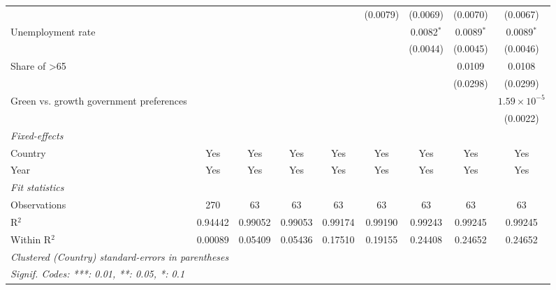 \begin{table}[htbp]
\begin{tabular}{lcccccccc}
                                                                            &          &          &          &              & (0.0079)     & (0.0069)     & (0.0070)     & (0.0067)\\   
      Unemployment rate                                                     &          &          &          &              &              & 0.0082$^{*}$ & 0.0089$^{*}$ & 0.0089$^{*}$\\   
                                                                            &          &          &          &              &              & (0.0044)     & (0.0045)     & (0.0046)\\   
      Share of >65                                                          &          &          &          &              &              &              & 0.0109       & 0.0108\\   
                                                                            &          &          &          &              &              &              & (0.0298)     & (0.0299)\\   
      Green vs. growth government preferences                               &          &          &          &              &              &              &              & $1.59\times 10^{-5}$\\    
                                                                            &          &          &          &              &              &              &              & (0.0022)\\   
      \midrule
      \emph{Fixed-effects}\\
      Country                                                               & Yes      & Yes      & Yes      & Yes          & Yes          & Yes          & Yes          & Yes\\  
      Year                                                                  & Yes      & Yes      & Yes      & Yes          & Yes          & Yes          & Yes          & Yes\\  
      \midrule
      \emph{Fit statistics}\\
      Observations                                                          & 270      & 63       & 63       & 63           & 63           & 63           & 63           & 63\\  
      R$^2$                                                                 & 0.94442  & 0.99052  & 0.99053  & 0.99174      & 0.99190      & 0.99243      & 0.99245      & 0.99245\\  
      Within R$^2$                                                          & 0.00089  & 0.05409  & 0.05436  & 0.17510      & 0.19155      & 0.24408      & 0.24652      & 0.24652\\  
      \midrule \midrule
      \multicolumn{9}{l}{\emph{Clustered (Country) standard-errors in parentheses}}\\
      \multicolumn{9}{l}{\emph{Signif. Codes: ***: 0.01, **: 0.05, *: 0.1}}\\
   \end{tabular}
\end{table}


